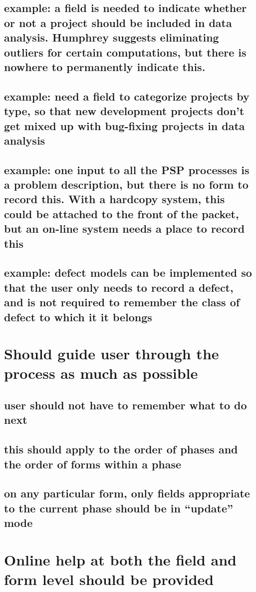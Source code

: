 \subsection{example: a field is needed to indicate whether or not a project
should be included in data analysis.  Humphrey suggests eliminating
outliers for certain computations, but there is nowhere to permanently
indicate this.}
\subsection{example: need a field to categorize projects by type, so that
new development projects don't get mixed up with bug-fixing projects in data analysis}
\subsection{example: one input to all the PSP processes is a problem description, but
there is no form to record this.  With a hardcopy system, this could be
attached to the front of the packet, but an on-line system needs a place to
record this}
\subsection{example: defect models can be implemented so that the user only
needs to record a defect, and is not required to remember the class of
defect to which it it belongs}
\section{Should guide user through the process as much as possible}
\subsection{user should not have to remember what to do next}
\subsection{this should apply to the order of phases and the order of forms
within a phase}
\subsection{on any particular form, only fields appropriate to the current
phase should be in ``update'' mode}
\section{Online help at both the field and form level should be provided}
